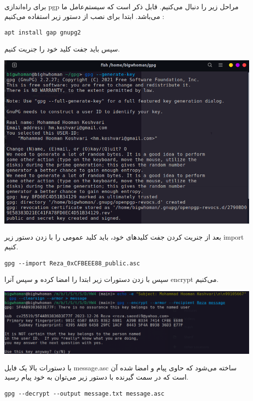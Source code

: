برای راه‌اندازی pgp 
مراحل زیر را دنبال می‌کنیم. قابل ذکر است که سیستم‌عامل ما 
می‌باشد. ابتدا برای نصب از دستور زیر استفاده می‌کنیم :
\begin{latin}
    \begin{lstlisting}
apt install gap gnupg2
    \end{lstlisting}
\end{latin}
سپس باید جفت کلید خود را جنریت کنیم.
\begin{center}
    \includegraphics[scale=0.5]{pics/pgp1.png}
\end{center}

بعد از جنریت کردن جفت‌ کلیدهای خود، باید کلید عمومی را با زدن دستور زیر import کنیم.
\begin{latin}
    \begin{lstlisting}
gpg --import Reza_0xCFBEEE88_public.asc
\end{lstlisting}
\end{latin}

سپس با زدن دستورات زیر ابتدا 
را امضا کرده و سپس آنرا encrypt 
می‌کنیم.


\begin{center}
    \includegraphics[scale=0.47]{pics/pgp_encrypt.png}
\end{center}
با دستورات بالا یک فایل message.asc 
ساخته می‌شود که حاوی پیام و امضا شده آن است که در سمت گیرنده با دستور زیر می‌توان به خود پیام رسید.
\begin{latin}
    \begin{lstlisting}
gpg --decrypt --output message.txt message.asc
\end{lstlisting}
\end{latin}


